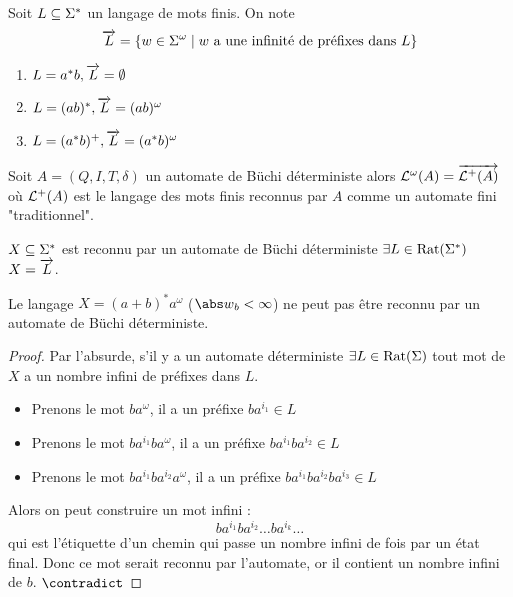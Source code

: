 \begin{definition}
	Soit $L \subseteq \Sigma^{*}$ un langage de mots finis. On note
	$$\overrightarrow{L} = \left\{w \in \Sigma^ {\omega} \mid w \text{ a une infinité de préfixes dans } L\right\}$$
\end{definition}


\begin{exemple}
	\begin{enumerate}
		\item $L = a^*b, \overrightarrow{L} = \emptyset$
		\item $L = (ab)^*, \overrightarrow{L} = (ab)^{\omega}$
		\item $L = (a^*b)^+, \overrightarrow{L} =  (a^*b)^{\omega}$
	\end{enumerate}
\end{exemple}


\begin{prop}[Admis]
	Soit $A = (Q,I,T,\delta)$ un automate de Büchi déterministe alors $\mathcal{L}^{\omega} (A) = \overrightarrow{\mathcal{L}^+ (A)}$
	où $\mathcal{L}^+ (A)$ est le langage des mots finis reconnus par $A$ comme un automate fini "traditionnel".
\end{prop}


\begin{coro}
	$X \subseteq \Sigma^{*}$ est reconnu par un automate de Büchi déterministe \ssi $\exists L \in \text{Rat}(\Sigma^{*})$
	\tq $X = \overrightarrow{L}$.
\end{coro}

\begin{prop}
	Le langage $X = (a+b)^*a^{\omega}$ ($ {\abs w}_b < \infty $) ne peut pas être reconnu par un automate de Büchi déterministe.
\end{prop}

\begin{proof}
	Par l'absurde, s'il y a un automate déterministe $\exists  L \in \text{Rat}(\Sigma)$ \tq tout mot de $X$ a un nombre infini de préfixes dans $L$.

	\begin{itemize}
		\item Prenons le mot $ba^{\omega}$, il a un préfixe $ba^{i_1} \in L$
		\item Prenons le mot $ba^{i_1}ba^{\omega}$, il a un préfixe $ba^{i_1}ba^{i_2} \in L$
		\item Prenons le mot $ba^{i_1}ba^{i_2}a^{\omega}$, il a un préfixe $ba^{i_1}ba^{i_2}ba^{i_3} \in L$
	\end{itemize}

	Alors on peut construire un mot infini :
	$$ ba^{i_1}ba^{i_2}\ldots ba^{i_k}\ldots$$
	qui est l'étiquette d'un chemin qui passe un nombre infini de fois par un état final.
	Donc ce mot serait reconnu par l'automate, or il contient un nombre infini de $b$.  $\contradict$
\end{proof}


